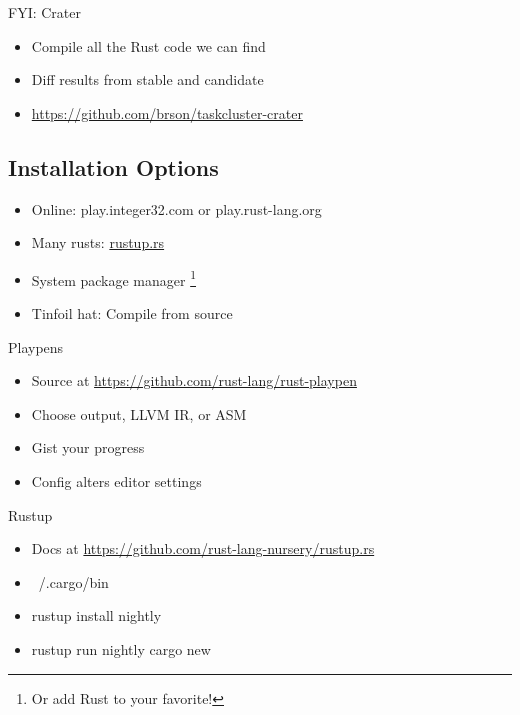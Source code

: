 \documentclass[xcolor={svgnames},hyperref]{beamer}
\begin{document}
    \begin{frame}
        FYI: Crater
        \begin{itemize}
            \item Compile all the Rust code we can find
            \item Diff results from stable and candidate
            \item \url{https://github.com/brson/taskcluster-crater}
        \end{itemize}
    \end{frame}

    \subsection{Installation Options}

    \begin{frame}
        \begin{itemize}
            \item Online: play.integer32.com or play.rust-lang.org
            \item Many rusts: \url{rustup.rs}
            \item System package manager \footnote{Or add Rust to your favorite!}
            \item Tinfoil hat: Compile from source
        \end{itemize}
    \end{frame}

    \begin{frame}
        Playpens
        \begin{itemize}
            \item Source at \url{https://github.com/rust-lang/rust-playpen}
            \item Choose output, LLVM IR, or ASM
            \item Gist your progress
            \item Config alters editor settings
        \end{itemize}
    \end{frame}

    \begin{frame}
        Rustup
        \begin{itemize}
            \item Docs at \url{https://github.com/rust-lang-nursery/rustup.rs}
            \item ~/.cargo/bin
            \item rustup install nightly
            \item rustup run nightly cargo new
        \end{itemize}
    \end{frame}
\end{document}
